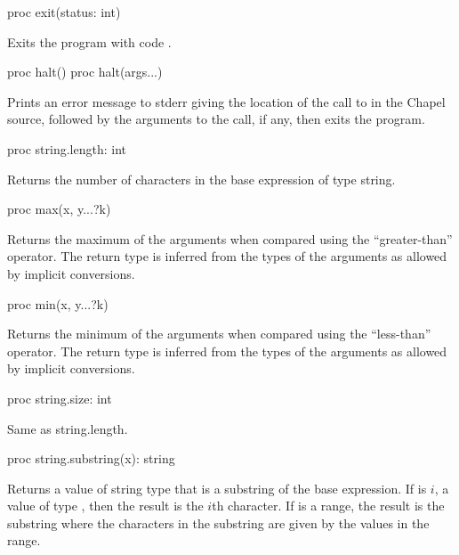 \begin{protohead}
proc exit(status: int)
\end{protohead}
\begin{protobody}
Exits the program with code .
\end{protobody}

\begin{protohead}
proc halt()
proc halt(args...)
\end{protohead}
\begin{protobody}
Prints an error message to stderr giving the location of the call to 
in the Chapel source, followed by the arguments to the call, if any,
then exits the program.
\end{protobody}

\begin{protohead}
proc string.length: int
\end{protohead}
\begin{protobody}
Returns the number of characters in the base expression of type string.
\end{protobody}

\begin{protohead}
proc max(x, y...?k)
\end{protohead}
\begin{protobody}
Returns the maximum of the arguments when compared using the
``greater-than'' operator.  The return type is inferred from the types
of the arguments as allowed by implicit conversions.
\end{protobody}

\begin{protohead}
proc min(x, y...?k)
\end{protohead}
\begin{protobody}
Returns the minimum of the arguments when compared using the
``less-than'' operator.  The return type is inferred from the types of
the arguments as allowed by implicit conversions.
\end{protobody}

\begin{protohead}
proc string.size: int
\end{protohead}
\begin{protobody}
Same as string.length.
\end{protobody}

\begin{protohead}
proc string.substring(x): string
\end{protohead}
\begin{protobody}
Returns a value of string type that is a substring of the base
expression.  If  is $i$, a value of type , then the
result is the $i$th character.  If  is a range, the result is
the substring where the characters in the substring are given by the
values in the range.
\end{protobody}

